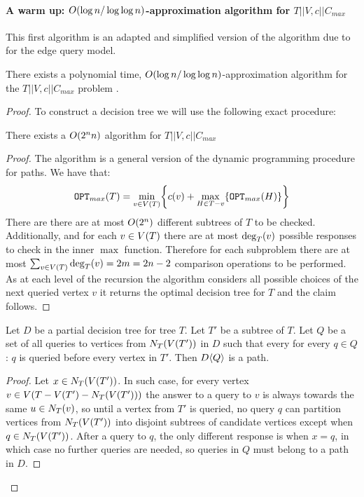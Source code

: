 \paragraph{A warm up: $O\mathopen{}\left( \log n/\log\log n \right)$-approximation algorithm  for $T||V,c||C_{max}$}
This first algorithm is an adapted and simplified version of the algorithm due to \cite{Cicalese2016OnTSPwNonUniCost} for the edge query model.
\begin{theorem}
    There exists a polynomial time, $O\mathopen{}\left( \log n/\log\log n \right)$-approximation algorithm for the $T||V,c||C_{max}$ problem .
    \begin{proof}
        
To construct a decision tree we will use the following exact procedure:
\begin{lemma}
    There exists a $O\mathopen{}\left( 2^nn \right)$ algorithm for $T||V,c||C_{max}$
    \begin{proof}
        The algorithm is a general version of the dynamic programming procedure for paths. We have that:
        $$
        \texttt{OPT}_{max}\mathopen{}\left( T \right) = \min_{v\in V\mathopen{}\left( T \right)}\mathopen{}\left\{ c\mathopen{}\left( v \right)+\max_{H\in T-v}\mathopen{}\left\{ \texttt{OPT}_{max}\mathopen{}\left( H \right) \right\} \right\}
        $$
        There are there are at most $O\mathopen{}\left( 2^n \right)$ different subtrees of $T$ to be checked. Additionally, and for each $v\in V\mathopen{}\left( T \right)$ there are at most $\deg_T\mathopen{}\left( v \right)$ possible responses to check in the inner $\max$ function. Therefore for each subproblem there are at most
        $
        \sum_{v\in V\mathopen{}\left( T \right)}\deg_T\mathopen{}\left( v \right) = 2m = 2n-2
        $
        comparison operations to be performed. As at each level of the recursion the algorithm considers all possible choices of the next queried vertex $v$ it returns the optimal decision tree for $T$ and the claim follows.
    \end{proof}
\end{lemma}
\begin{observation}\label{neighborsPathObservation}
    Let $D$ be a partial decision tree for tree $T$. Let $T'$ be a subtree of $T$. Let $Q$ be a set of all queries to vertices from $N_{T}\mathopen{}\left( V\mathopen{}\left( T' \right) \right)$ in $D$ such that every for every $q\in Q$: $q$ is queried before every vertex in $T'$. Then $D\mathopen{}\langle Q \rangle$ is a path. 
    \begin{proof}
        Let $x\in N_{T}\mathopen{}\left( V\mathopen{}\left( T' \right) \right)$. In such case, for every vertex $v\in V\mathopen{}\left( T-V\mathopen{}\left( T' \right)-N_{T}\mathopen{}\left( V\mathopen{}\left( T' \right) \right) \right)$ the answer to a query to $v$ is always towards the same $u\in N_{T}\mathopen{}\left( v \right)$, so until a vertex from $T'$ is queried, no query $q$ can partition vertices from $N_{T}\mathopen{}\left( V\mathopen{}\left( T' \right) \right)$ into disjoint subtrees of candidate vertices except when $q\in N_{T}\mathopen{}\left( V\mathopen{}\left( T' \right) \right)$. After a query to $q$, the only different response is when $x=q$, in which case no further queries are needed, so queries in $Q$ must belong to a path in $D$.
    \end{proof}
\end{observation}




\end{proof}
\end{theorem}
